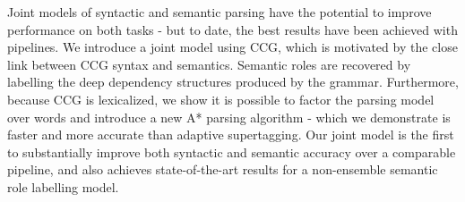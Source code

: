 Joint models of syntactic and semantic parsing have the potential to improve performance on both tasks - but to date, the best results have been achieved with pipelines. We introduce a joint model using CCG, which is motivated by the close link between CCG syntax and semantics. Semantic roles are recovered by labelling the deep dependency structures produced by the grammar. Furthermore, because CCG is lexicalized, we show it is possible to factor the parsing model over words and introduce a new A* parsing algorithm - which we demonstrate is faster and more accurate than adaptive supertagging. Our joint model is the first to substantially improve both syntactic and semantic accuracy over a comparable pipeline, and also achieves state-of-the-art results for a non-ensemble semantic role labelling model.
